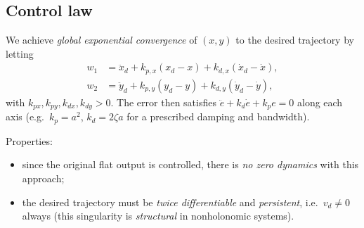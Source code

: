 \documentclass[11pt,a4paper]{article}
\newcommand{\vd}{v_d}
\theoremstyle{definition}
\theoremstyle{plain}
\theoremstyle{remark}
\begin{document}
\subsection{Control law}

We achieve \emph{global exponential convergence} of $(x,y)$ to the desired trajectory by letting
\begin{align}
w_1&=\ddot x_d+k_{p,x}(x_d-x)+k_{d,x}(\dot x_d-\dot x),\\
w_2&=\ddot y_d+k_{p,y}(y_d-y)+k_{d,y}(\dot y_d-\dot y),
\end{align}
with $k_{px},k_{py},k_{dx},k_{dy}>0$. The error then satisfies $\ddot e+k_d\dot e+k_pe=0$ along each axis (e.g.\ $k_p=a^2$, $k_d=2\zeta a$ for a prescribed damping and bandwidth).

Properties:
\begin{itemize}[nosep]
\item since the original flat output is controlled, there is \emph{no zero dynamics} with this approach;
\item the desired trajectory must be \emph{twice differentiable} and \emph{persistent}, i.e.\ $\vd\neq0$ always (this singularity is \emph{structural} in nonholonomic systems).
\end{itemize}
\end{document}
